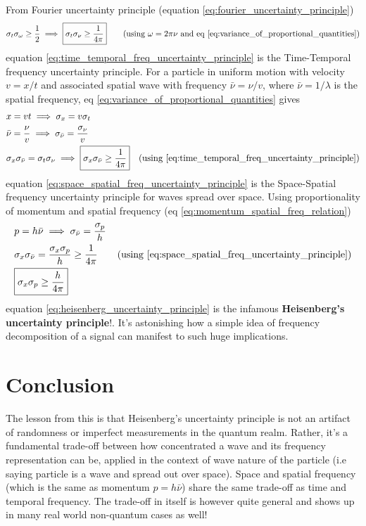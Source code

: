 \documentclass[11pt, a4paper]{article}
\let\oldsection\section
\renewcommand{\section}{%
	\setcounter{equation}{0}%
	\oldsection%
}
\newcommand{\eqrefnp}[1]{\textup{\ref{#1}}}  %
\newcommand{\stdev}[1]{\sigma_{#1}}
\begin{document}
	From Fourier uncertainty principle (equation \eqrefnp{eq:fourier_uncertainty_principle})
	\begin{equation}\label{eq:time_temporal_freq_uncertainty_principle}
		\stdev{t} \stdev{\omega} \geq \frac{1}{2} \implies \boxed{\stdev{t} \stdev{\nu} \geq \frac{1}{4\pi}} \qquad \text{(using $\omega = 2\pi \nu$ and eq \eqrefnp{eq:variance_of_proportional_quantities})}
	\end{equation}
	equation \eqref{eq:time_temporal_freq_uncertainty_principle} is the Time-Temporal frequency uncertainty principle. For a particle in uniform motion with velocity $v = x / t$ and associated spatial wave with frequency $\bar{\nu} = \nu / v$, where $\bar{\nu} = 1/\lambda$ is the spatial frequency, eq \eqref{eq:variance_of_proportional_quantities} gives
	\begin{align}
		& x = vt \implies \stdev{x} = v\stdev{t} \nonumber \\
		& \bar{\nu} = \frac{\nu}{v} \implies \stdev{\bar{\nu}} = \frac{\stdev{\nu}}{v} \nonumber \\
		& \stdev{x}\stdev{\bar{\nu}} = \stdev{t} \stdev{\nu} \implies \boxed{\stdev{x}\stdev{\bar{\nu}} \geq \frac{1}{4\pi}} \quad \text{(using \eqrefnp{eq:time_temporal_freq_uncertainty_principle})} \label{eq:space_spatial_freq_uncertainty_principle}
	\end{align}
	equation \eqref{eq:space_spatial_freq_uncertainty_principle} is the Space-Spatial frequency uncertainty principle for waves spread over space. Using proportionality of momentum and spatial frequency (eq \eqrefnp{eq:momentum_spatial_freq_relation})
	\begin{align}
		& p = h \bar{\nu} \implies \stdev{\bar{\nu}} = \frac{\stdev{p}}{h}  \nonumber \\
		& \stdev{x}\stdev{\bar{\nu}} = \frac{\stdev{x}\stdev{p}}{h} \geq \frac{1}{4 \pi} \nonumber \tag{using \eqrefnp{eq:space_spatial_freq_uncertainty_principle}} \\
		& \boxed{\stdev{x}\stdev{p} \geq \frac{h}{4 \pi}} \label{eq:heisenberg_uncertainty_principle}
	\end{align}
	equation \eqref{eq:heisenberg_uncertainty_principle} is the infamous \textbf{Heisenberg's uncertainty principle}!. It's astonishing how a simple idea of frequency decomposition of a signal can manifest to such huge implications.
	
	\section{Conclusion}
	The lesson from this is that Heisenberg's uncertainty principle is not an artifact of randomness or imperfect measurements in the quantum realm. Rather, it's a fundamental trade-off between how concentrated a wave and its frequency representation can be, applied in the context of wave nature of the particle (i.e saying particle is a wave and spread out over space). Space and spatial frequency (which is the same as momentum $p=h\bar{\nu}$) share the same trade-off as time and temporal frequency. The trade-off in itself is however quite general and shows up in many real world non-quantum cases as well!
	
\end{document}
